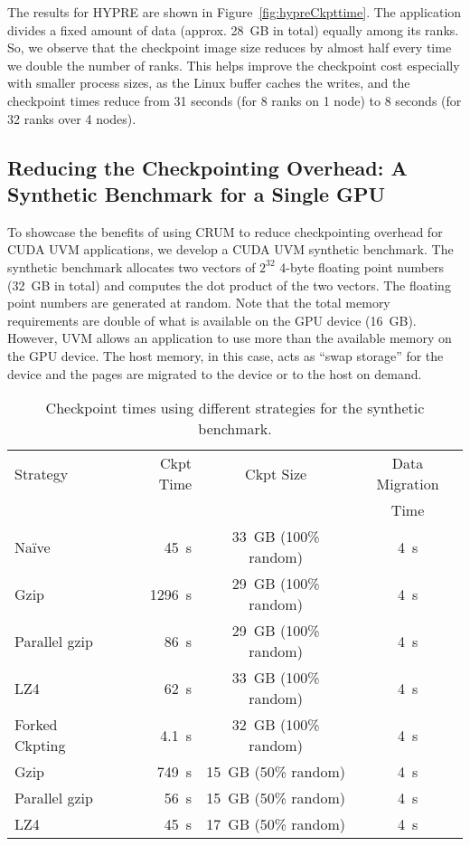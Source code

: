 \documentclass[11pt]{article}
\begin{document}
The results for HYPRE are shown in Figure~\ref{fig:hypreCkpttime}. The application divides
a fixed amount of data (approx. 28~GB in total) equally among its ranks. So, we
observe that the checkpoint image size reduces by almost half every time we
double the number of ranks.  This helps improve the checkpoint cost especially
with smaller process sizes, as the Linux buffer caches the writes, and the
checkpoint times reduce from 31 seconds (for 8 ranks on 1 node) to 8 seconds
(for 32 ranks over 4 nodes). 

\subsection{Reducing the Checkpointing Overhead:
	  A Synthetic Benchmark for a Single GPU}

To showcase the benefits of using CRUM to reduce checkpointing overhead
for CUDA UVM applications,
we develop a CUDA UVM synthetic benchmark. The synthetic benchmark allocates two vectors of
$2^{32}$ 4-byte floating point numbers (32~GB in total) and computes the dot
product of the two vectors. The floating point numbers are generated at random.
Note that the total memory requirements are double of what is available on the
GPU device (16~GB). However, UVM allows an application to use more than the
available memory on the GPU device. The host memory, in this case, acts as ``swap
storage'' for the device and the pages are migrated to the device or to the host
on demand.


\begin{table}[ht]
  \caption{\label{tbl:synthCkpting} Checkpoint times using different strategies for the synthetic benchmark.}
\centering
  \begin{tabular}{|l|r|c|c|}
  \hline
    Strategy & Ckpt Time & Ckpt Size & Data Migration\\
             &           &           &  Time   \\
  \hline
    Na{\"i}ve  & 45~s  & 33~GB (100\% random) & 4~s \\
  \hline
    Gzip  & 1296~s & 29~GB (100\% random) & 4~s \\
  \hline
    Parallel gzip  & 86~s & 29~GB (100\% random) & 4~s \\
  \hline
    LZ4  & 62~s & 33~GB (100\% random) & 4~s \\
  \hline
    Forked Ckpting & 4.1~s & 32~GB (100\% random) & 4~s \\
  \hline
    Gzip  & 749~s  & 15~GB (50\% random) & 4~s \\
  \hline
    Parallel gzip  & 56~s  & 15~GB (50\% random) & 4~s \\
  \hline
    LZ4  & 45~s  & 17~GB (50\% random) & 4~s \\
  \hline
\end{tabular}
\end{table}
\end{document}
